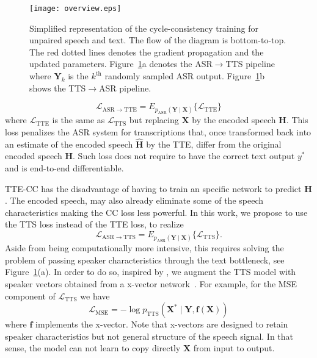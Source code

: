\documentclass[a4paper]{article}
\begin{document}
\begin{figure}[H]
\begin{centering}
\texttt{[image: overview.eps]}
\caption{Simplified representation of the cycle-consistency training for unpaired speech and text. The flow of the diagram is bottom-to-top. The red dotted lines denotes the gradient propagation and the updated parameters. Figure~\ref{fig:overview}a denotes the ASR$\rightarrow$TTS pipeline where $\mathbf{Y}_{k}$ is the $k^{\mathrm{th}}$ randomly sampled ASR output. Figure~\ref{fig:overview}b shows the TTS$\rightarrow$ASR pipeline.}\label{fig:overview}
\end{centering}
\end{figure}


\begin{equation}
\mathcal{L}_{\mathrm{ASR}\rightarrow\mathrm{TTE}}= E_{p_{\mathrm{ASR}}(\mathbf{Y}\mid \mathbf{X})}\{\mathcal{L}_{\mathrm{TTE}}\} \label{eq:6}
\end{equation}
where $\mathcal{L}_{\mathrm{TTE}}$ is the same as $\mathcal{L}_{\mathrm{TTS}}$ but replacing $\mathbf{X}$ by the encoded speech $\mathbf{H}$. This loss penalizes the ASR system for transcriptions that, once transformed back into an estimate of the encoded speech $\hat{\mathbf{H}}$ by the TTE, differ from the original encoded speech $\mathbf{H}$. Such loss does not require to have the correct text output $y^*$ and is end-to-end differentiable.



TTE-CC has the disadvantage of having to train an specific network to predict $\mathbf{H}$. The encoded speech, may also already eliminate some of the speech characteristics making the CC loss less powerful. In this work, we propose to use the TTS loss instead of the TTE loss, to realize 
\begin{equation}
\mathcal{L}_{\mathrm{ASR}\rightarrow\mathrm{TTS}}= E_{p_{\mathrm{ASR}}(\mathbf{Y}\mid \mathbf{X})}\{\mathcal{L}_{\mathrm{TTS}}\}\label{eq:7}.
\end{equation}
Aside from being computationally more intensive, this requires solving the problem of passing speaker characteristics through the text bottleneck, see Figure~\ref{fig:overview}(a). In order to do so, inspired by \cite{tjandra2017listening}, we augment the TTS model with speaker vectors obtained from a x-vector network~\cite{snyder2018x}. For example, for the MSE component of $\mathcal{L}_{\mathrm{TTS}}$ we have
\begin{equation}
\mathcal{L}_{\mathrm{MSE}}= -\log p_{\mathrm{TTS}}(\mathbf{X}^*\mid\mathbf{Y}, \mathbf{f}(\mathbf{X})) \label{eq:8}
\end{equation}
where $\mathbf{f}$ implements the x-vector. Note that x-vectors are designed to retain speaker characteristics but not general structure of the speech signal. In that sense, the model can not learn to copy directly $\mathbf{X}$ from input to output.
\end{document}
